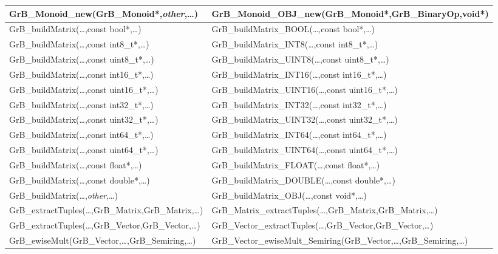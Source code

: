 \begin{table}[htb]
{\begin{tabular}{l|l}
{\sf GrB\_Monoid\_new(GrB\_Monoid*,\emph{other},\ldots)} 	& {\sf GrB\_Monoid\_OBJ\_new(GrB\_Monoid*,GrB\_BinaryOp,void*)} \\ \hline
{\sf GrB\_buildMatrix(\ldots,const bool*,\ldots)}		& {\sf GrB\_buildMatrix\_BOOL(\ldots,const bool*,\ldots)} \\
{\sf GrB\_buildMatrix(\ldots,const int8\_t*,\ldots)}		& {\sf GrB\_buildMatrix\_INT8(\ldots,const int8\_t*,\ldots)} \\
{\sf GrB\_buildMatrix(\ldots,const uint8\_t*,\ldots)}		& {\sf GrB\_buildMatrix\_UINT8(\ldots,const uint8\_t*,\ldots)} \\
{\sf GrB\_buildMatrix(\ldots,const int16\_t*,\ldots)}		& {\sf GrB\_buildMatrix\_INT16(\ldots,const int16\_t*,\ldots)} \\
{\sf GrB\_buildMatrix(\ldots,const uint16\_t*,\ldots)}		& {\sf GrB\_buildMatrix\_UINT16(\ldots,const uint16\_t*,\ldots)} \\
{\sf GrB\_buildMatrix(\ldots,const int32\_t*,\ldots)}		& {\sf GrB\_buildMatrix\_INT32(\ldots,const int32\_t*,\ldots)} \\
{\sf GrB\_buildMatrix(\ldots,const uint32\_t*,\ldots)}		& {\sf GrB\_buildMatrix\_UINT32(\ldots,const uint32\_t*,\ldots)} \\
{\sf GrB\_buildMatrix(\ldots,const int64\_t*,\ldots)}		& {\sf GrB\_buildMatrix\_INT64(\ldots,const int64\_t*,\ldots)} \\
{\sf GrB\_buildMatrix(\ldots,const uint64\_t*,\ldots)}		& {\sf GrB\_buildMatrix\_UINT64(\ldots,const uint64\_t*,\ldots)} \\
{\sf GrB\_buildMatrix(\ldots,const float*,\ldots)}		& {\sf GrB\_buildMatrix\_FLOAT(\ldots,const float*,\ldots)} \\
{\sf GrB\_buildMatrix(\ldots,const double*,\ldots)}		& {\sf GrB\_buildMatrix\_DOUBLE(\ldots,const double*,\ldots)} \\
{\sf GrB\_buildMatrix(\ldots,\emph{other},\ldots)}		& {\sf GrB\_buildMatrix\_OBJ(\ldots,const void*,\ldots)} \\ \hline
{\sf GrB\_extractTuples(\ldots,GrB\_Matrix,GrB\_Matrix,\ldots)} & {\sf GrB\_Matrix\_extractTuples(\ldots,GrB\_Matrix,GrB\_Matrix,\ldots)} \\
{\sf GrB\_extractTuples(\ldots,GrB\_Vector,GrB\_Vector,\ldots)} & {\sf GrB\_Vector\_extractTuples(\ldots,GrB\_Vector,GrB\_Vector,\ldots)} \\ \hline
{\sf GrB\_ewiseMult(GrB\_Vector,\ldots,GrB\_Semiring,\ldots)} 	& {\sf GrB\_Vector\_ewiseMult\_Semiring(GrB\_Vector,\ldots,GrB\_Semiring,\ldots)} \\

\end{tabular}}
\end{table}
